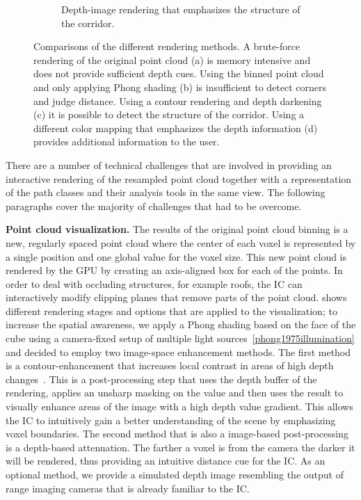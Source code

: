 \begin{figure}
\begin{subfigure}[b]{0.21\textwidth}
    \caption{Depth-image rendering that emphasizes the structure of the corridor.}
    \label{contributions:usar:rendering:depth}
\end{subfigure}
\caption{Comparisons of the different rendering methods.  A brute-force rendering of the original point cloud (a) is memory intensive and does not provide sufficient depth cues.  Using the binned point cloud and only applying Phong shading (b) is insufficient to detect corners and judge distance.  Using a contour rendering and depth darkening (c) it is possible to detect the structure of the corridor.  Using a different color mapping that emphasizes the depth information (d) provides additional information to the user.}
\label{contributions:usar:rendering}
\end{figure}

There are a number of technical challenges that are involved in providing an interactive rendering of the resampled point cloud together with a representation of the path classes and their analysis tools in the same view.  The following paragraphs cover the majority of challenges that had to be overcome.

\textbf{Point cloud visualization. }  The results of the original point cloud binning is a new, regularly spaced point cloud where the center of each voxel is represented by a single  position and one global value for the voxel size.  This new point cloud is rendered by the GPU by creating an axis-aligned box for each of the points.  In order to deal with occluding structures, for example roofs, the IC can interactively modify clipping planes that remove parts of the point cloud.   shows different rendering stages and options that are applied to the visualization; to increase the spatial awareness, we apply a Phong shading based on the face of the cube using a camera-fixed setup of multiple light sources~\ref{phong1975illumination} and decided to employ two image-space enhancement methods.  The first method is a contour-enhancement that increases local contrast in areas of high depth changes~\cite{luft2006image}.  This is a post-processing step that uses the depth buffer of the rendering, applies an unsharp masking on the value and then uses the result to visually enhance areas of the image with a high depth value gradient.  This allows the IC to intuitively gain a better understanding of the scene by emphasizing voxel boundaries.  The second method that is also a image-based post-processing is a depth-based attenuation.  The farther a voxel is from the camera the darker it will be rendered, thus providing an intuitive distance cue for the IC.  As an optional method, we provide a simulated depth image resembling the output of range imaging cameras that is already familiar to the IC.

